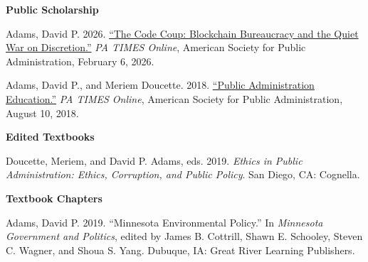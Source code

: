 \documentclass[11pt,letterpaper]{article}
\renewenvironment{itemize}{
  \begin{list}{}{
    \setlength{\leftmargin}{1.5em}
    \setlength{\itemsep}{0.25em}
    \setlength{\parskip}{0pt}
    \setlength{\parsep}{0.25em}
  }
}{
  \end{list}
}
\begin{document}
\textbf{Public Scholarship}
\begin{itemize}\leftmargin=2pt\itemindent=-15pt
    \item Adams, David P. 2026. \href{https://patimes.org/the-code-coup-blockchain-bureaucracy-and-the-quiet-war-on-discretion/}{``The Code Coup: Blockchain Bureaucracy and the Quiet War on Discretion.''} \emph{PA TIMES Online}, American Society for Public Administration, February 6, 2026.
    \item Adams, David P., and Meriem Doucette. 2018. \href{https://patimes.org/public-administration-education/}{``Public Administration Education.''} \emph{PA TIMES Online}, American Society for Public Administration, August 10, 2018.
\end{itemize}

\textbf{Edited Textbooks}
\begin{itemize}\leftmargin=2pt\itemindent=-15pt
    \item Doucette, Meriem, and David P. Adams, eds. 2019. \emph{Ethics in Public Administration: Ethics, Corruption, and Public Policy}. San Diego, CA: Cognella.
\end{itemize}

\textbf{Textbook Chapters}
\begin{itemize}\leftmargin=2pt\itemindent=-15pt
    \item Adams, David P. 2019. ``Minnesota Environmental Policy.'' In \emph{Minnesota Government and Politics}, edited by James B. Cottrill, Shawn E. Schooley, Steven C. Wagner, and Shoua S. Yang. Dubuque, IA: Great River Learning Publishers.
\end{itemize}
\end{document}
